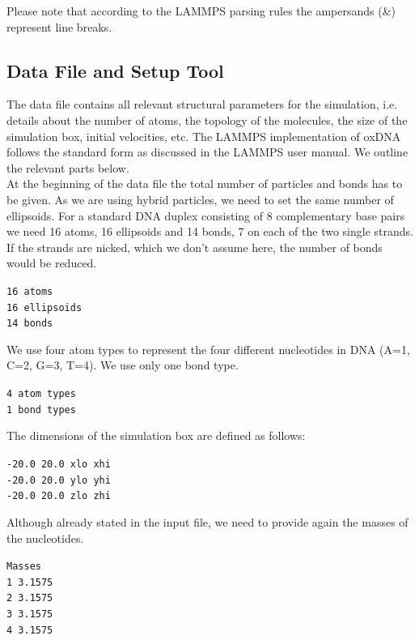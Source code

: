 \documentclass[12pt,onecolumn]{article}
\begin{document}
Please note that according to the LAMMPS parsing rules the ampersands (\&) represent line breaks.

\subsection{Data File and Setup Tool}\label{data_setup}

The data file contains all relevant structural parameters for the simulation, i.e. details about 
the number of atoms, the topology of the molecules, the size of the simulation box, initial velocities, etc. 
The LAMMPS implementation of oxDNA follows the standard form as discussed in the LAMMPS user manual. 
We outline the relevant parts below.\\

\noindent At the beginning of the data file the total number of particles and bonds has to be given. As we are using
hybrid particles, we need to set the same number of ellipsoids. For a standard DNA duplex consisting
of 8 complementary base pairs we need 16 atoms, 16 ellipsoids and 14 bonds, 7 on each of the two single strands.
If the strands are nicked, which we don't assume here, the number of bonds would be reduced. 

\smallskip
\texttt{16 atoms\\
16 ellipsoids\\
14 bonds\\
}
\smallskip

\noindent We use four atom types to represent the four different nucleotides in DNA (A=1, C=2, G=3, T=4). 
We use only one bond type.

\smallskip
\texttt{4 atom types\\
1 bond types
}
\smallskip

\noindent The dimensions of the simulation box are defined as follows:

\smallskip
\texttt{-20.0 20.0 xlo xhi\\
-20.0 20.0 ylo yhi\\
-20.0 20.0 zlo zhi\\
}
\smallskip

\noindent Although already stated in the input file, we need to provide again the masses of the nucleotides.

\smallskip
\texttt{Masses\\
\vspace*{0.3cm}
1 3.1575\\
2 3.1575\\
3 3.1575\\
4 3.1575\\
}
\smallskip
\end{document}
